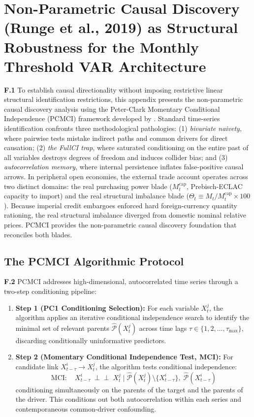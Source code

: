 \section{Non-Parametric Causal Discovery (Runge et al., 2019) as Structural Robustness for the Monthly Threshold VAR Architecture}
\label{app:causal_pcmci}

\textbf{F.1} To establish causal directionality without imposing restrictive linear structural identification restrictions, this appendix presents the non-parametric causal discovery analysis using the Peter-Clark Momentary Conditional Independence (PCMCI) framework developed by \citet{Runge2019}. Standard time-series identification confronts three methodological pathologies: (1) \emph{bivariate naivety}, where pairwise tests mistake indirect paths and common drivers for direct causation; (2) \emph{the FullCI trap}, where saturated conditioning on the entire past of all variables destroys degrees of freedom and induces collider bias; and (3) \emph{autocorrelation memory}, where internal persistence inflates false-positive causal arrows. In peripheral open economies, the external trade account operates across two distinct domains: the real purchasing power blade ($M^{\text{cap}}_t$, Prebisch-ECLAC capacity to import) and the real structural imbalance blade ($\Theta_t \equiv M_t / M^{\text{cap}}_t \times 100$). Because imperial credit embargoes enforced hard foreign-currency quantity rationing, the real structural imbalance diverged from domestic nominal relative prices. PCMCI provides the non-parametric causal discovery foundation that reconciles both blades.

\subsection{The PCMCI Algorithmic Protocol}
\label{app:pcmci_protocol}

\textbf{F.2} PCMCI addresses high-dimensional, autocorrelated time series through a two-step conditioning pipeline:
\begin{enumerate}[leftmargin=2em]
	\item \textbf{Step 1 (PC1 Conditioning Selection):} For each variable $X^j_t$, the algorithm applies an iterative conditional independence search to identify the minimal set of relevant parents $\hat{\mathcal{P}}(X^j_t)$ across time lags $\tau \in \{1, 2, \dots, \tau_{\max}\}$, discarding conditionally uninformative predictors.
	\item \textbf{Step 2 (Momentary Conditional Independence Test, MCI):} For candidate link $X^i_{t-\tau} \to X^j_t$, the algorithm tests conditional independence:
	\begin{equation}
		\text{MCI}: \quad X^i_{t-\tau} \;\perp\!\!\!\perp\; X^j_t \;\big|\; \hat{\mathcal{P}}(X^j_t) \setminus \{X^i_{t-\tau}\}, \; \hat{\mathcal{P}}(X^i_{t-\tau})
		\label{eq:mci_test}
	\end{equation}
	conditioning simultaneously on the parents of the target and the parents of the driver. This conditions out both autocorrelation within each series and contemporaneous common-driver confounding.
\end{enumerate}

